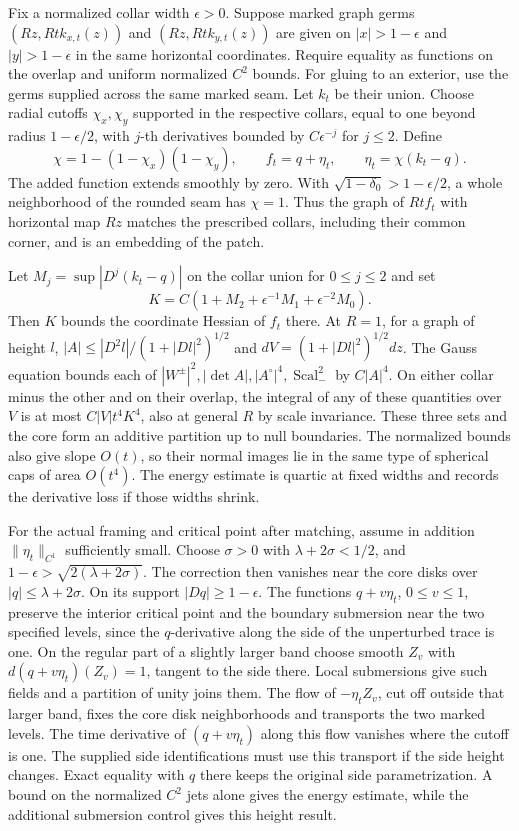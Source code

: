 \documentclass[11pt,letterpaper]{article}
\numberwithin{equation}{section}
\theoremstyle{definition}
\DeclareMathOperator{\Scal}{Scal}
\begin{document}
Fix a normalized collar width \(\epsilon>0\). Suppose marked
graph germs \((Rz,Rt k_{x,t}(z))\) and \((Rz,Rt k_{y,t}(z))\)
are given on \(|x|>1-\epsilon\) and \(|y|>1-\epsilon\)
in the same horizontal coordinates. Require equality as functions
on the overlap and uniform normalized \(C^2\) bounds. For gluing
to an exterior, use the germs supplied across the same marked seam.
Let \(k_t\) be their union. Choose radial cutoffs \(\chi_x,\chi_y\)
supported in the respective collars, equal to one beyond
radius \(1-\epsilon/2\), with \(j\)-th derivatives
bounded by \(C\epsilon^{-j}\) for \(j\le2\).
Define
\[
 \chi=1-(1-\chi_x)(1-\chi_y),\qquad
 f_t=q+\eta_t,\qquad \eta_t=\chi(k_t-q).
\]
The added function extends smoothly by zero. With
\(\sqrt{1-\delta_0}>1-\epsilon/2\), a whole neighborhood
of the rounded seam has \(\chi=1\). Thus the graph of \(Rt f_t\)
with horizontal map \(Rz\) matches the prescribed collars,
including their common corner, and is an embedding of the patch.

Let \(M_j=\sup |D^j(k_t-q)|\) on the collar union for
\(0\le j\le2\) and set
\[
        K=C(1+M_2+\epsilon^{-1}M_1+\epsilon^{-2}M_0).
\]
Then \(K\) bounds the coordinate Hessian of \(f_t\) there.
At \(R=1\), for a graph of height \(l\),
\(|A|\le|D^2l|/(1+|Dl|^2)^{1/2}\) and
\(dV=(1+|Dl|^2)^{1/2}dz\). The Gauss equation bounds each
of \(|W^\pm|^2,|\det A|,|A^\circ|^4,\Scal_-^2\) by
\(C|A|^4\). On either collar minus the other and on their
overlap, the integral of any of these quantities over \(V\)
is at most \(C|V|t^4K^4\), also at general \(R\) by scale
invariance. These three sets and the core form an additive
partition up to null boundaries. The normalized bounds also give
slope \(O(t)\), so their normal images lie in the same type of
spherical caps of area \(O(t^4)\). The energy estimate is quartic at
fixed widths and records the derivative loss if those widths shrink.

For the actual framing and critical point after matching,
assume in addition \(\|\eta_t\|_{C^1}\) sufficiently small.
Choose \(\sigma>0\) with \(\lambda+2\sigma<1/2\), and
\(1-\epsilon>\sqrt{2(\lambda+2\sigma)}\).
The correction then vanishes near the core disks over
\(|q|\le\lambda+2\sigma\). On its support \(|Dq|\ge1-\epsilon\).
The functions \(q+v\eta_t\), \(0\le v\le1\), preserve the
interior critical point and the boundary submersion near the
two specified levels, since the \(q\)-derivative along the
side of the unperturbed trace is one. On the regular part
of a slightly larger band choose smooth \(Z_v\) with
\(d(q+v\eta_t)(Z_v)=1\), tangent to the side there.
Local submersions give such fields and a partition of unity
joins them. The flow of \(-\eta_t Z_v\), cut off outside
that larger band, fixes the core disk neighborhoods and
transports the two marked levels. The time derivative of
\((q+v\eta_t)\) along this flow vanishes where the cutoff is one.
The supplied side identifications must use this transport
if the side height changes. Exact equality with \(q\) there
keeps the original side parametrization. A bound on the
normalized \(C^2\) jets alone gives the energy estimate,
while the additional submersion control gives this height result.
\end{document}
